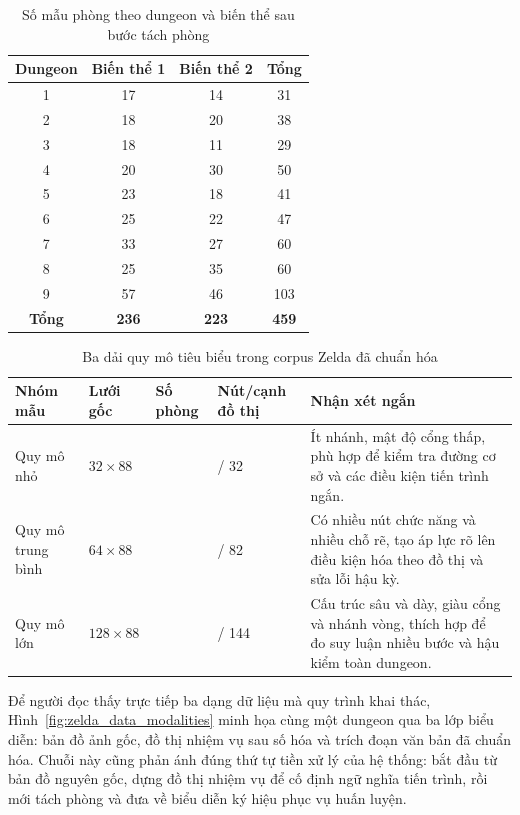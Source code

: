 \documentclass[oneside,a4paper,12pt]{extreport}
\begin{document}
\begin{table}[H]
\centering
\footnotesize
\caption{Số mẫu phòng theo dungeon và biến thể sau bước tách phòng}
\label{tab:room_counts_per_dungeon}
\begin{tabular}{c c c c}
\toprule
Dungeon & Biến thể 1 & Biến thể 2 & Tổng \\
\midrule
1 & 17 & 14 & 31 \\
2 & 18 & 20 & 38 \\
3 & 18 & 11 & 29 \\
4 & 20 & 30 & 50 \\
5 & 23 & 18 & 41 \\
6 & 25 & 22 & 47 \\
7 & 33 & 27 & 60 \\
8 & 25 & 35 & 60 \\
9 & 57 & 46 & 103 \\
\midrule
\textbf{Tổng} & \textbf{236} & \textbf{223} & \textbf{459} \\
\bottomrule
\end{tabular}
\end{table}

\begin{table}[H]
\centering
\caption{Ba dải quy mô tiêu biểu trong corpus Zelda đã chuẩn hóa}
\label{tab:dataset_examples}
\footnotesize
\begin{tabular}{>{\raggedright\arraybackslash}p{2.45cm} >{\centering\arraybackslash}p{2.0cm} >{\centering\arraybackslash}p{1.5cm} >{\centering\arraybackslash}p{2.0cm} >{\raggedright\arraybackslash}p{4.6cm}}
\toprule
Nhóm mẫu & Lưới gốc & Số phòng & Nút/cạnh đồ thị & Nhận xét ngắn \\
\midrule
Quy mô nhỏ & $32\times 88$ & 14 & 16 / 32 & Ít nhánh, mật độ cổng thấp, phù hợp để kiểm tra đường cơ sở và các điều kiện tiến trình ngắn. \\
Quy mô trung bình & $64\times 88$ & 30 & 35 / 82 & Có nhiều nút chức năng và nhiều chỗ rẽ, tạo áp lực rõ lên điều kiện hóa theo đồ thị và sửa lỗi hậu kỳ. \\
Quy mô lớn & $128\times 88$ & 57 & 62 / 144 & Cấu trúc sâu và dày, giàu cổng và nhánh vòng, thích hợp để đo suy luận nhiều bước và hậu kiểm toàn dungeon. \\
\bottomrule
\end{tabular}
\end{table}

Để người đọc thấy trực tiếp ba dạng dữ liệu mà quy trình khai thác, Hình~\ref{fig:zelda_data_modalities} minh họa cùng một dungeon qua ba lớp biểu diễn: bản đồ ảnh gốc, đồ thị nhiệm vụ sau số hóa và trích đoạn văn bản đã chuẩn hóa. Chuỗi này cũng phản ánh đúng thứ tự tiền xử lý của hệ thống: bắt đầu từ bản đồ nguyên gốc, dựng đồ thị nhiệm vụ để cố định ngữ nghĩa tiến trình, rồi mới tách phòng và đưa về biểu diễn ký hiệu phục vụ huấn luyện.
\end{document}
